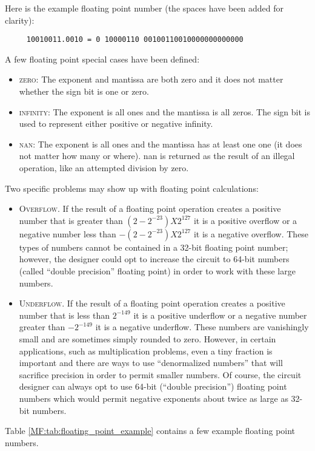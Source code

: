 Here is the example floating point number (the spaces have been added for clarity):

\begin{verbatim}
     10010011.0010 = 0 10000110 00100110010000000000000
\end{verbatim}

A few floating point special cases have been defined:

\begin{itemize}
  \item \textsc{zero}: The exponent and mantissa are both zero and it does not matter whether the sign bit is one or zero. 
  \item \textsc{infinity}: The exponent is all ones and the mantissa is all zeros. The sign bit is used to represent either positive or negative infinity. 
  \item \textsc{\gls{nan}}: The exponent is all ones and the mantissa has at least one one (it does not matter how many or where). \gls{nan} is returned as the result of an illegal operation, like an attempted division by zero.
\end{itemize}

Two specific problems may show up with floating point calculations: 

\begin{itemize}
  \item \textsc{Overflow}. If the result of a floating point operation creates a positive number that is greater than $ (2-2^{-23})X 2^{127} $ it is a positive overflow or a negative number less than $ -(2-2^{-23})X 2^{127} $ it is a negative overflow. These types of numbers cannot be contained in a 32-bit floating point number; however, the designer could opt to increase the circuit to 64-bit numbers (called ``double precision'' floating point) in order to work with these large numbers.
  \item \textsc{Underflow}. If the result of a floating point operation creates a positive number that is less than $ 2^{-149} $ it is a positive underflow or a negative number greater than $ -2^{-149} $ it is a negative underflow. These numbers are vanishingly small and are sometimes simply rounded to zero. However, in certain applications, such as multiplication problems, even a tiny fraction is important and there are ways to use ``denormalized numbers'' that will sacrifice precision in order to permit smaller numbers. Of course, the circuit designer can always opt to use 64-bit (``double precision'') floating point numbers which would permit negative exponents about twice as large as 32-bit numbers.

\end{itemize}
Table \ref{MF:tab:floating_point_example} contains a few example floating point numbers.


